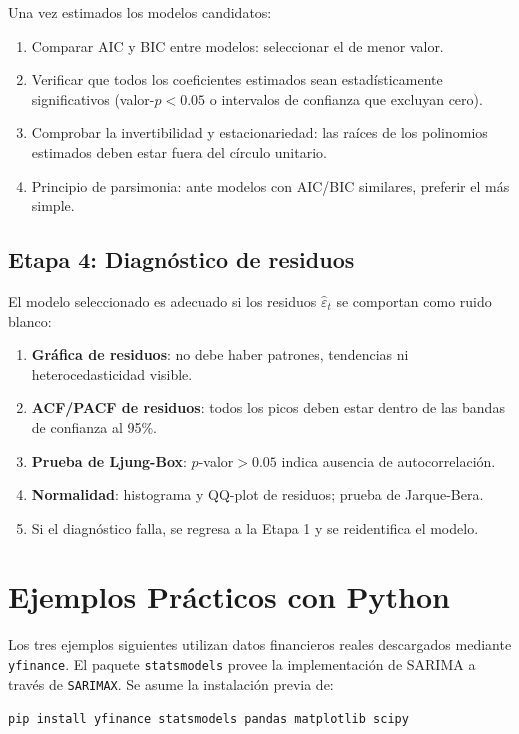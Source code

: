 \documentclass[12pt,a4paper]{article}
\begin{document}
Una vez estimados los modelos candidatos:
\begin{enumerate}
  \item Comparar AIC y BIC entre modelos: seleccionar el de menor valor.
  \item Verificar que todos los coeficientes estimados sean estadísticamente significativos
        (valor-$p < 0.05$ o intervalos de confianza que excluyan cero).
  \item Comprobar la invertibilidad y estacionariedad: las raíces de los polinomios
        estimados deben estar fuera del círculo unitario.
  \item Principio de parsimonia: ante modelos con AIC/BIC similares, preferir el más simple.
\end{enumerate}

\subsection{Etapa 4: Diagnóstico de residuos}

El modelo seleccionado es adecuado si los residuos $\hat{\varepsilon}_t$ se comportan
como ruido blanco:
\begin{enumerate}
  \item \textbf{Gráfica de residuos}: no debe haber patrones, tendencias ni heterocedasticidad visible.
  \item \textbf{ACF/PACF de residuos}: todos los picos deben estar dentro de las bandas
        de confianza al 95\%.
  \item \textbf{Prueba de Ljung-Box}: $p$-valor$> 0.05$ indica ausencia de autocorrelación.
  \item \textbf{Normalidad}: histograma y QQ-plot de residuos; prueba de Jarque-Bera.
  \item Si el diagnóstico falla, se regresa a la Etapa 1 y se reidentifica el modelo.
\end{enumerate}

\section{Ejemplos Prácticos con Python}

Los tres ejemplos siguientes utilizan datos financieros reales descargados mediante
\texttt{yfinance}. El paquete \texttt{statsmodels} provee la implementación de SARIMA
a través de \texttt{SARIMAX}. Se asume la instalación previa de:
\begin{center}
  \texttt{pip install yfinance statsmodels pandas matplotlib scipy}
\end{center}
\end{document}
